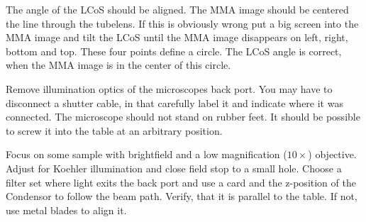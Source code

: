 \documentclass{scrartcl}
\begin{document}
 The angle of the LCoS should be aligned. The MMA
image should be centered the line through the tubelens. If this is
obviously wrong put a big screen into the MMA image and tilt the LCoS
until the MMA image disappears on left, right, bottom and top. These
four points define a circle. The LCoS angle is correct, when the MMA
image is in the center of this circle.


 Remove illumination optics of the microscopes
back port. You may have to disconnect a shutter cable, in that
carefully label it and indicate where it was connected.  The
microscope should not stand on rubber feet. It should be possible to
screw it into the table at an arbitrary position.


 Focus on some sample with
brightfield and a low magnification ($10\times$) objective. Adjust for
Koehler illumination and close field stop to a small hole. Choose a
filter set where light exits the back port and use a card and the
z-position of the Condensor to follow the beam path. Verify, that it
is parallel to the table. If not, use metal blades to align it.
\end{document}
